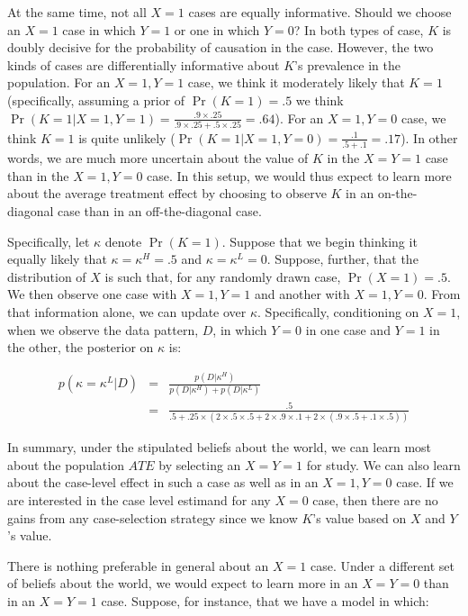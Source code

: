 \documentclass[
  12pt,
]{book}
\begin{document}
At the same time, not all \(X=1\) cases are equally informative. Should we choose an \(X=1\) case in which \(Y=1\) or one in which \(Y=0\)? In both types of case, \(K\) is doubly decisive for the probability of causation in the case. However, the two kinds of cases are differentially informative about \(K\)'s prevalence in the population. For an \(X=1, Y=1\) case, we think it moderately likely that \(K=1\) (specifically, assuming a prior of \(\Pr(K=1)=.5\) we think \(\Pr(K=1 | X=1, Y=1) = \frac{.9 \times .25}{.9 \times .25+.5 \times.25}=.64\)). For an \(X=1, Y=0\) case, we think \(K=1\) is quite unlikely (\(\Pr(K=1 | X=1, Y=0) = \frac{.1}{.5+.1}=.17\)). In other words, we are much more uncertain about the value of \(K\) in the \(X=Y=1\) case than in the \(X=1, Y=0\) case. In this setup, we would thus expect to learn more about the average treatment effect by choosing to observe \(K\) in an on-the-diagonal case than in an off-the-diagonal case.

Specifically, let \(\kappa\) denote \(\Pr(K=1)\). Suppose that we begin thinking it equally likely that \(\kappa=\kappa^H = .5\) and \(\kappa=\kappa^L=0\). Suppose, further, that the distribution of \(X\) is such that, for any randomly drawn case, \(\Pr(X=1) = .5\). We then observe one case with \(X=1, Y=1\) and another with \(X=1, Y=0\). From that information alone, we can update over \(\kappa\). Specifically, conditioning on \(X=1\), when we observe the data pattern, \(D\), in which \(Y=0\) in one case and \(Y=1\) in the other, the posterior on \(\kappa\) is:

\begin{eqnarray*}
p(\kappa = \kappa^L|D) &=&  \frac{p(D|\kappa^H)}{p(D|\kappa^H)+p(D|\kappa^L)}\\
&=&\frac{.5}{.5 + .25\times(2\times.5\times.5 + 2\times.9\times.1 + 2\times(.9\times.5 +.1\times.5))}
\end{eqnarray*}

In summary, under the stipulated beliefs about the world, we can learn most about the population \(ATE\) by selecting an \(X=Y=1\) for study. We can also learn about the case-level effect in such a case as well as in an \(X=1, Y=0\) case. If we are interested in the case level estimand for any \(X=0\) case, then there are no gains from any case-selection strategy since we know \(K\)'s value based on \(X\) and \(Y\)'s value.

There is nothing preferable in general about an \(X=1\) case. Under a different set of beliefs about the world, we would expect to learn more in an \(X=Y=0\) than in an \(X=Y=1\) case. Suppose, for instance, that we have a model in which:
\end{document}
